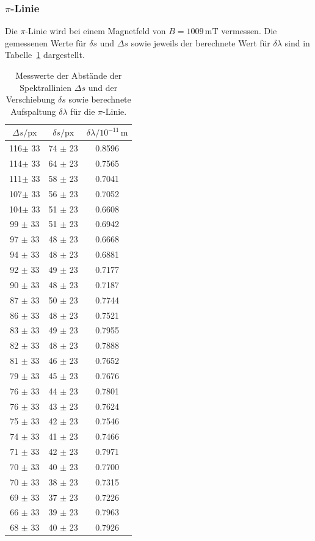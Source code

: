 \subsubsection*{$\pi$-Linie}
Die $\pi$-Linie wird bei einem Magnetfeld von $B = 1009 \, \si{\milli\tesla}$ vermessen.
Die gemessenen Werte für 
$\delta s$ und $\Delta s$ sowie jeweils der berechnete Wert für $\delta \lambda$ sind in Tabelle \ref{tab:atab3} dargestellt.
\FloatBarrier
\begin{table}[h]
    \centering
    \caption{Messwerte der Abstände der Spektrallinien $\Delta s$ und der Verschiebung $\delta s$ sowie berechnete Aufspaltung $\delta \lambda$ für die $\pi$-Linie.}
    \label{tab:atab3}
    \begin{tabular}{c c c}
        \toprule
        {$\Delta s / \text{px}$} & {$\delta s / \text{px}$} & {$\delta \lambda / 10^{-11}\, \si{\meter}$}\\
        \midrule
        116$\pm$ 33  & 74 $\pm$ 23 & 0.8596 \\
        114$\pm$ 33  & 64 $\pm$ 23 & 0.7565 \\
        111$\pm$ 33  & 58 $\pm$ 23 & 0.7041 \\
        107$\pm$ 33  & 56 $\pm$ 23 & 0.7052 \\
        104$\pm$ 33  & 51 $\pm$ 23 & 0.6608 \\
        99 $\pm$ 33  & 51 $\pm$ 23 & 0.6942 \\
        97 $\pm$ 33  & 48 $\pm$ 23 & 0.6668 \\
        94 $\pm$ 33  & 48 $\pm$ 23 & 0.6881 \\
        92 $\pm$ 33  & 49 $\pm$ 23 & 0.7177 \\
        90 $\pm$ 33  & 48 $\pm$ 23 & 0.7187 \\
        87 $\pm$ 33  & 50 $\pm$ 23 & 0.7744 \\
        86 $\pm$ 33  & 48 $\pm$ 23 & 0.7521 \\
        83 $\pm$ 33  & 49 $\pm$ 23 & 0.7955 \\
        82 $\pm$ 33  & 48 $\pm$ 23 & 0.7888 \\
        81 $\pm$ 33  & 46 $\pm$ 23 & 0.7652 \\
        79 $\pm$ 33  & 45 $\pm$ 23 & 0.7676 \\
        76 $\pm$ 33  & 44 $\pm$ 23 & 0.7801 \\
        76 $\pm$ 33  & 43 $\pm$ 23 & 0.7624 \\
        75 $\pm$ 33  & 42 $\pm$ 23 & 0.7546 \\
        74 $\pm$ 33  & 41 $\pm$ 23 & 0.7466 \\
        71 $\pm$ 33  & 42 $\pm$ 23 & 0.7971 \\
        70 $\pm$ 33  & 40 $\pm$ 23 & 0.7700 \\
        70 $\pm$ 33  & 38 $\pm$ 23 & 0.7315 \\
        69 $\pm$ 33  & 37 $\pm$ 23 & 0.7226 \\
        66 $\pm$ 33  & 39 $\pm$ 23 & 0.7963 \\
        68 $\pm$ 33  & 40 $\pm$ 23 & 0.7926 \\
        \bottomrule
    \end{tabular}
\end{table}
